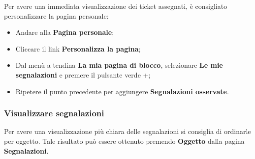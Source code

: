 	Per avere una immediata visualizzazione dei ticket assegnati, è consigliato personalizzare 
	la pagina personale: 
	\begin{itemize}
		\item Andare alla \textbf{Pagina personale}; 
		\item Cliccare il link \textbf{Personalizza la pagina}; 
		\item Dal menù a tendina \textbf{La mia pagina di blocco}, selezionare \textbf{Le mie segnalazioni} 
		e premere il pulsante verde +; 
		\item Ripetere il punto precedente per aggiungere \textbf{Segnalazioni osservate}. 
	
	\end{itemize}

	
\subsubsection{Visualizzare segnalazioni}

	Per avere una visualizzazione più chiara delle segnalazioni si consiglia di ordinarle per 
	oggetto. Tale risultato può essere ottenuto premendo \textbf{Oggetto} dalla pagina \textbf{Segnalazioni}.


